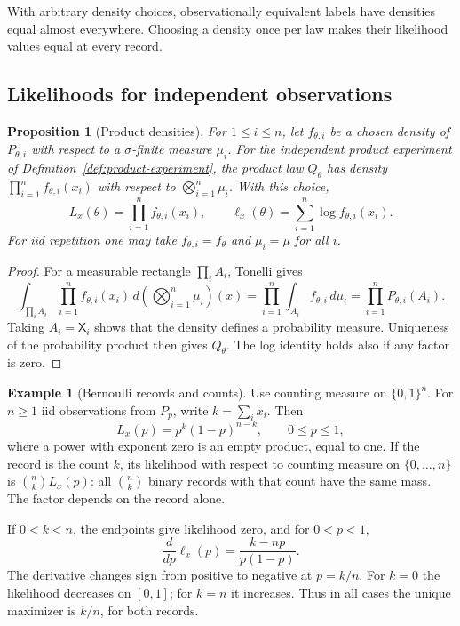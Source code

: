 \documentclass[11pt,oneside]{book}
\newtheorem{proposition}[theorem]{Proposition}
\theoremstyle{definition}
\newtheorem{example}[theorem]{Example}
\theoremstyle{remark}
\begin{document}
With arbitrary density choices, observationally equivalent labels have
densities equal almost everywhere. Choosing a density once per law makes
their likelihood values equal at every record.

\subsection{Likelihoods for independent observations}
\label{subsec:product-likelihood}

\begin{proposition}[Product densities]
\label{prop:product-densities}
For $1\leq i\leq n$, let $f_{\theta,i}$ be a chosen density of
$P_{\theta,i}$ with respect to a $\sigma$-finite measure $\mu_i$.
For the independent product experiment of
Definition~\ref{def:product-experiment}, the product law $Q_\theta$
has density $\prod_{i=1}^n f_{\theta,i}(x_i)$ with respect to
$\bigotimes_{i=1}^n\mu_i$. With this choice,
\[
L_x(\theta)=\prod_{i=1}^n f_{\theta,i}(x_i),\qquad
\ell_x(\theta)=\sum_{i=1}^n\log f_{\theta,i}(x_i).
\]
For iid repetition one may take $f_{\theta,i}=f_\theta$ and $\mu_i=\mu$
for all $i$.
\end{proposition}
\begin{proof}
For a measurable rectangle $\prod_i A_i$, Tonelli gives
\[
\int_{\prod_i A_i}\prod_{i=1}^n f_{\theta,i}(x_i)\,
 d\left(\bigotimes_{i=1}^n\mu_i\right)(x)
=\prod_{i=1}^n\int_{A_i}f_{\theta,i}\,d\mu_i
=\prod_{i=1}^n P_{\theta,i}(A_i).
\]
Taking $A_i=\mathsf X_i$ shows that the density defines a probability
measure. Uniqueness of the probability product then gives $Q_\theta$.
The log identity holds also if any factor is zero.
\end{proof}

\begin{example}[Bernoulli records and counts]
\label{ex:bernoulli-likelihood}
Use counting measure on $\{0,1\}^n$. For $n\geq1$ iid observations from
$P_p$, write $k=\sum_i x_i$. Then
\[
L_x(p)=p^k(1-p)^{n-k},\qquad 0\leq p\leq1,
\]
where a power with exponent zero is an empty product, equal to one.
If the record is the count $k$, its likelihood with respect to counting
measure on $\{0,\ldots,n\}$ is $\binom nk L_x(p)$: all $\binom nk$ binary
records with that count have the same mass. The factor depends on the
record alone.

If $0<k<n$, the endpoints give likelihood zero, and for $0<p<1$,
\[
\frac{d}{dp}\ell_x(p)=\frac{k-np}{p(1-p)}.
\]
The derivative changes sign from positive to negative at $p=k/n$.
For $k=0$ the likelihood decreases on $[0,1]$; for $k=n$ it increases.
Thus in all cases the unique maximizer is $k/n$, for both records.
\end{example}
\end{document}
